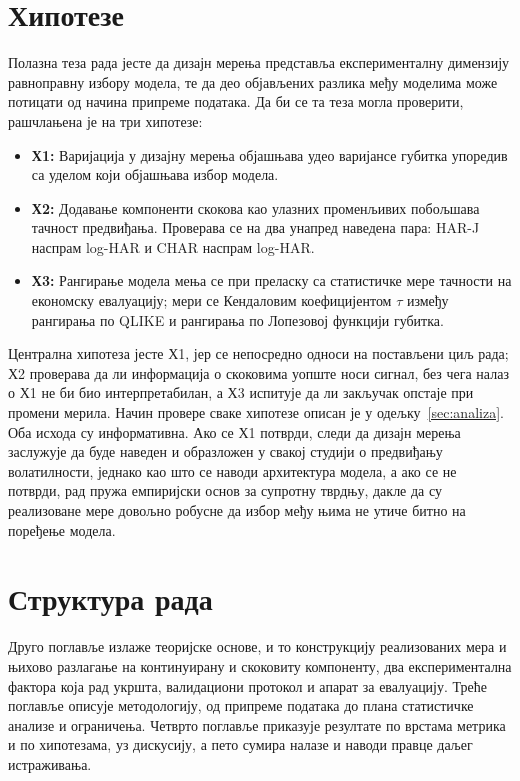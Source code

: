 \section{Хипотезе}
\label{sec:hipoteze}

Полазна теза рада јесте да дизајн мерења представља експерименталну димензију
равноправну избору модела, те да део објављених разлика међу моделима може потицати од
начина припреме података. Да би се та теза могла проверити, рашчлањена је на три
хипотезе:

\begin{itemize}
\item \textbf{Х1:} Варијација у дизајну мерења објашњава удео варијансе губитка
      упоредив са уделом који објашњава избор модела.
\item \textbf{Х2:} Додавање компоненти скокова као улазних променљивих побољшава
      тачност предвиђања. Проверава се на два унапред наведена пара: HAR-J наспрам
      log-HAR и CHAR наспрам log-HAR.
\item \textbf{Х3:} Рангирање модела мења се при преласку са статистичке мере тачности на
      економску евалуацију; мери се Кендаловим коефицијентом $\tau$ између рангирања по
      QLIKE и рангирања по Лопезовој функцији губитка.
\end{itemize}

Централна хипотеза јесте Х1, јер се непосредно односи на постављени циљ рада; Х2
проверава да ли информација о скоковима уопште носи сигнал, без чега налаз о Х1 не би
био интерпретабилан, а Х3 испитује да ли закључак опстаје при промени мерила. Начин
провере сваке хипотезе описан је у одељку~\ref{sec:analiza}. Оба исхода су
информативна. Ако се Х1 потврди, следи да дизајн мерења заслужује да буде наведен и
образложен у свакој студији о предвиђању волатилности, једнако као што се наводи
архитектура модела, а ако се не потврди, рад пружа емпиријски основ за супротну
тврдњу, дакле да су реализоване мере довољно робусне да избор међу њима не утиче битно
на поређење модела.

\section{Структура рада}

Друго поглавље излаже теоријске основе, и то конструкцију реализованих мера и њихово
разлагање на континуирану и скоковиту компоненту, два експериментална фактора која рад
укршта, валидациони протокол и апарат за евалуацију. Треће поглавље описује
методологију, од припреме података до плана статистичке анализе и ограничења. Четврто
поглавље приказује резултате по врстама метрика и по хипотезама, уз дискусију, а пето
сумира налазе и наводи правце даљег истраживања.
